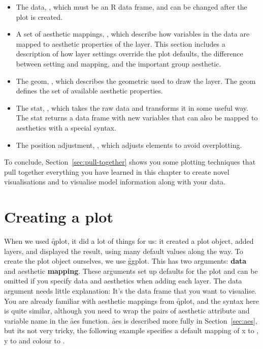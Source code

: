 \begin{itemize}
  \item The data, , which must be an R data frame, and can be changed after the plot is created.

  \item A set of aesthetic mappings, , which describe how variables in the data are mapped to aesthetic properties of the layer.  This section includes a description of how layer settings override the plot defaults, the difference between setting and mapping, and the important group aesthetic.

  \item The geom, , which describes the geometric used to draw the layer.  The geom defines the set of available aesthetic properties.

  \item The stat, , which takes the raw data and transforms it in some useful way.  The stat returns a data frame with new variables that can also be mapped to aesthetics with a special syntax.

  \item The position adjustment, , which adjusts elements to avoid overplotting.
\end{itemize}

To conclude, Section~\ref{sec:pull-together} shows you some plotting techniques that pull together everything you have learned in this chapter to create novel visualisations and to visualise model information along with your data.

\section{Creating a plot}
\label{sec:ggplot}

When we used \f{qplot}, it did a lot of things for us: it created a plot object, added layers, and displayed the result, using many default values along the way. To create the plot object ourselves, we use \f{ggplot}.  This has two arguments: {\bf data} and aesthetic {\bf mapping}. These arguments set up defaults for the plot and can be omitted if you specify data and aesthetics when adding each layer.  The data argument needs little explanation: It's the data frame that you want to visualise.  You are already familiar with aesthetic mappings from \f{qplot}, and the syntax here is quite similar, although you need to wrap the pairs of aesthetic attribute and variable name in the \f{aes} function.  \f{aes} is described more fully in Section~\ref{sec:aes}, but its not very tricky, the following example specifies a default mapping of x to , y to  and colour to .

